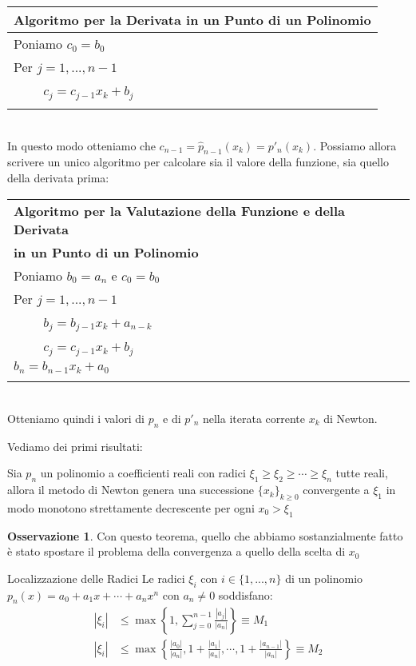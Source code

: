 \documentclass[11pt,a4paper,twoside]{article}
\theoremstyle{definition}
\newtheorem*{oss}{Osservazione}
\begin{document}
\begin{tabular}{l}
\\
\textbf{Algoritmo per la Derivata in un Punto di un Polinomio}\\
\hline
Poniamo $c_0 = b_0$\\
Per $j = 1,...,n-1$\\
$\qquad$ $c_j = c_{j-1}x_k + b_j$\\
\\
\end{tabular}\\
In questo modo otteniamo che $c_{n-1} = \hat p_{n-1}(x_k) = p'_n(x_k)$. Possiamo allora scrivere un unico algoritmo per calcolare sia il valore della funzione, sia quello della derivata prima:

\begin{tabular}{l}
\\
\textbf{Algoritmo per la Valutazione della Funzione e della Derivata}\\
\textbf{in un Punto di un Polinomio}\\
\hline
Poniamo $b_0 = a_n$ e $c_0 = b_0$\\
Per $j = 1,...,n-1$\\
$\qquad$ $b_j = b_{j-1} x_k + a_{n-k}$\\
$\qquad$ $c_j = c_{j-1}x_k + b_j$\\
$b_n = b_{n-1}x_k + a_0$\\
\\
\end{tabular}\\
Otteniamo quindi i valori di $p_n$ e di $p'_n$ nella iterata corrente $x_k$ di Newton.

Vediamo dei primi risultati:

\begin{thm}{}{}
	Sia $p_n$ un polinomio a coefficienti reali con radici $\xi_1 \geq \xi_2\geq \cdots \geq \xi_n$ tutte reali, allora il metodo di Newton genera una successione $\{x_k\}_{k \geq 0}$ convergente a $\xi_1$ in modo monotono strettamente decrescente per ogni $x_0>\xi_1$
\end{thm}

\begin{oss}
	Con questo teorema, quello che abbiamo sostanzialmente fatto è stato spostare il problema della convergenza a quello della scelta di $x_0$
\end{oss}

\begin{thm}{Localizzazione delle Radici}{}\label{LocRad}
	Le radici $\xi_i$ con $i \in \{1,...,n\}$ di un polinomio $p_n(x) = a_0 + a_1x + \cdots + a_nx^n$ con $a_n \neq 0$ soddisfano:
	\begin{align*}
		|\xi_i| &\leq \max\left\{ 1, \sum_{j = 0}^{n-1} \frac{|a_j|}{|a_n|} \right\}\equiv M_1\\
		|\xi_i| &\leq \max \left\{ \frac{|a_0|}{|a_n|}, 1+ \frac{|a_1|}{|a_n|},\cdots, 1 + \frac{|a_{n-1}|}{|a_n|} \right\} \equiv M_2
	\end{align*}
\end{thm}
\end{document}
